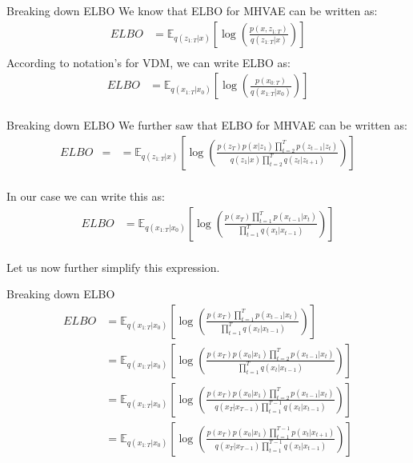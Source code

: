 \begin{frame}{Breaking down ELBO}
    We know that ELBO for MHVAE can be written as:
    \begin{align*}
        ELBO &=  \mathbb{E}_{q(z_{1:T}|x)} \left[ \log \left( \frac{p(x, z_{1:T})}{q(z_{1:T}|x)} \right) \right] \\
    \end{align*}
    According to notation's for VDM, we can write ELBO as:
    \begin{align*}
        ELBO &=  \mathbb{E}_{q(x_{1:T}|x_0)} \left[ \log \left( \frac{p(x_{0:T})}{q(x_{1:T}|x_0)} \right) \right] \\
    \end{align*}
\end{frame}

\begin{frame}{Breaking down ELBO}
    We further saw that ELBO for MHVAE can be written as:
    \begin{align*}
        ELBO &= &= \mathbb{E}_{q(z_{1:T}|x)} \left[ \log \left( \frac{p(z_T)p(x|z_1) \prod_{t=2}^{T} p(z_{t-1}|z_t)}{q(z_1|x) \prod_{t=2}^{T} q(z_t|z_{t+1})} \right) \right] \\
    \end{align*}

    In our case we can write this as:
    \begin{align*}
        ELBO &= \mathbb{E}_{q(x_{1:T}|x_0)} \left[ \log \left( \frac{p(x_T) \prod_{t=1}^{T} p(x_{t-1}|x_t)}{\prod_{t=1}^{T} q(x_t|x_{t-1})} \right) \right] \\
    \end{align*}

    Let us now further simplify this expression.
\end{frame}

\begin{frame}{Breaking down ELBO}
    \begin{align*}
        ELBO &= \mathbb{E}_{q(x_{1:T}|x_0)} \left[ \log \left( \frac{p(x_T) \prod_{t=1}^{T} p(x_{t-1}|x_t)}{\prod_{t=1}^{T} q(x_t|x_{t-1})} \right) \right] \\
        &= \mathbb{E}_{q(x_{1:T}|x_0)} \left[ \log \left( \frac{p(x_T)p(x_0|x_1) \prod_{t=2}^{T} p(x_{t-1}|x_t)}{\prod_{t=1}^{T} q(x_t|x_{t-1})} \right) \right] \\
        &= \mathbb{E}_{q(x_{1:T}|x_0)} \left[ \log \left( \frac{p(x_T)p(x_0|x_1) \prod_{t=2}^{T} p(x_{t-1}|x_t)}{q(x_T|x_{T-1}) \prod_{t=1}^{T-1} q(x_t|x_{t-1})} \right) \right] \\
        &= \mathbb{E}_{q(x_{1:T}|x_0)} \left[ \log \left( \frac{p(x_T)p(x_0|x_1) \prod_{t=1}^{T-1} p(x_{t}|x_{t+1})}{q(x_T|x_{T-1}) \prod_{t=1}^{T-1} q(x_t|x_{t-1})} \right) \right] \\
    \end{align*}
\end{frame}

